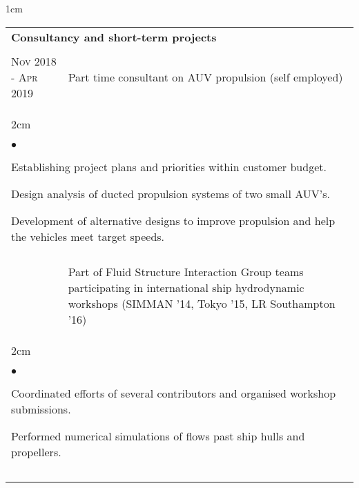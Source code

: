\documentclass[a4paper,10pt]{article}
\newcommand{\squishlist}{
	\begin{list}{$\bullet$}
	{
		\setlength{\itemsep}{0pt}
		\setlength{\parsep}{0pt}
		\setlength{\topsep}{0pt}
		\setlength{\partopsep}{0pt}
		\setlength{\leftmargin}{2em}
		\setlength{\labelwidth}{1.5em}
		\setlength{\labelsep}{0.5em}
	}
}
\newcommand{\squishend}{\end{list}}
\begin{document}
\begin{minipage}{\textwidth}
\begin{adjustwidth}{}{1cm}
\begin{tabular}{p{3.5cm} p{12.9cm}}
\\
\multicolumn{2}{l}{\textbf{Consultancy and short-term projects}} \\
\\

\textsc{Nov 2018 - Apr 2019} & Part time consultant on AUV propulsion (self employed) \\
%
\multicolumn{2}{l}{
\hspace{1cm}\begin{minipage}[t]{\textwidth}
\begin{adjustwidth}{}{2cm}
\squishlist
	\item Establishing project plans and priorities within customer budget.
	\item Design analysis of ducted propulsion systems of two small AUV's.
	\item Development of alternative designs to improve propulsion and help the vehicles meet target speeds.
\squishend
\end{adjustwidth}
\end{minipage}
} \\
\\

\begin{comment}
\textsc{Dec 2014, Dec 2015, Oct 2016} & Part of Fluid Structure Interaction Group teams
		participating in international ship hydrodynamic workshops
		(SIMMAN '14, Tokyo '15, LR Southampton '16) \vspace{0.1cm} \\
%
\multicolumn{2}{l}{
\hspace{1cm}\begin{minipage}[t]{\textwidth}
\begin{adjustwidth}{}{2cm}
\squishlist
	\item Coordinated efforts of several contributors and organised workshop submissions.
	\item Performed numerical simulations of flows past ship hulls and propellers.
\squishend
\end{adjustwidth}
\end{minipage}
} \\
\\
\end{comment}


\end{tabular}
\end{adjustwidth}
\end{minipage}
\end{document}
